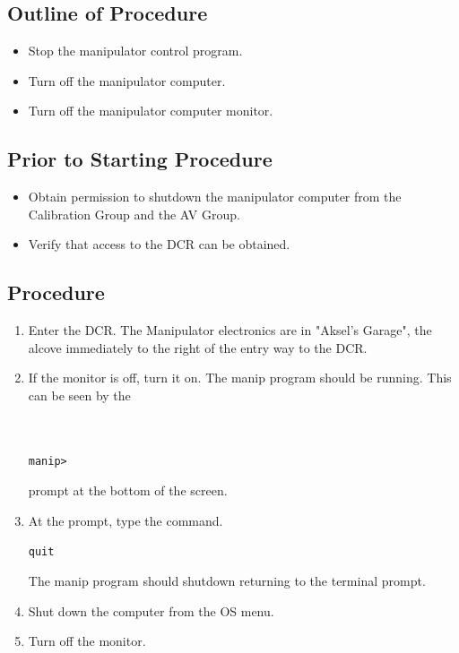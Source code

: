 \subsection{Outline of Procedure}
\begin{itemize}
\item Stop the manipulator control program.
\item Turn off the manipulator computer.
\item Turn off the manipulator computer monitor.
\end{itemize}
\subsection{Prior to Starting Procedure}
\begin{itemize}
\item Obtain permission to shutdown the manipulator computer from the Calibration Group and the AV Group.
\item Verify that access to the DCR can be obtained.
\end{itemize}

\subsection{Procedure}
\begin{enumerate}
\item \CheckBox[name=p1]{} Enter the DCR. The Manipulator electronics are in "Aksel's Garage", the alcove immediately to the right of the entry way to the DCR.
\item \CheckBox[name=p2]{} If the monitor is off, turn it on. The
manip program should be running. This can be seen by the \\ \\ \\ 
\begin{verbatim}
manip>
\end{verbatim}
prompt at the bottom of the screen.
\item \CheckBox[name=p3]{} At the prompt, type the command.
\begin{verbatim}
quit
\end{verbatim}
The manip program should shutdown returning to the terminal prompt.
\item \CheckBox[name=p4]{} Shut down the computer from the OS menu.
\item \CheckBox[name=p5]{} Turn off the monitor.
\end{enumerate}
